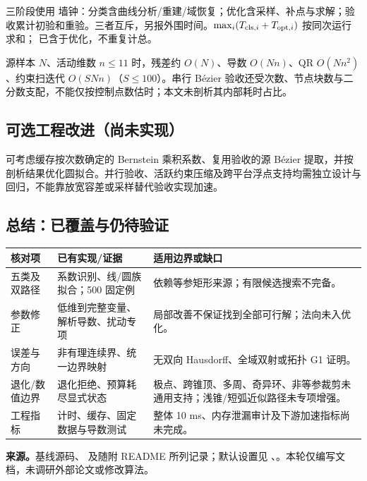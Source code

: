 三阶段使用  墙钟：分类含曲线分析/重建/域恢复；优化含采样、补点与求解；验收累计初验和重验。三者互斥，另报外围时间。$\max_i(T_{{\rm cls},i}+T_{{\rm opt},i})$ 按同次运行求和； 已含于优化，不重复计总。

源样本 $N$、活动维数 $n\le11$ 时，残差约 $O(N)$、导数 $O(Nn)$、QR $O(Nn^2)$、约束扫迭代 $O(SNn)$（$S\le100$）。串行 Bézier 验收还受次数、节点块数与二分数支配，不能仅按控制点数估时；本文未剖析其内部耗时占比。

\subsection{可选工程改进（尚未实现）}
可考虑缓存按次数确定的 Bernstein 乘积系数、复用验收的源 Bézier 提取，并按剖析结果优化圆拟合。并行验收、活跃约束压缩及跨平台浮点支持均需独立设计与回归，不能靠放宽容差或采样替代验收实现加速。

\subsection{总结：已覆盖与仍待验证}
\par{\small\begin{tabularx}{\linewidth}{@{}l Y Y@{}}\toprule
核对项 & 已有实现/证据 & 适用边界或缺口\\\midrule
五类及双路径 & 系数识别、线/圆族拟合；500 固定例 & 依赖等参矩形来源；有限候选搜索不完备。\\
参数修正 & 低维到完整变量、解析导数、扰动专项 & 局部改善不保证找到全部可行解；法向未入优化。\\
误差与方向 & 非有理连续界、统一边界映射 & 无双向 Hausdorff、全域双射或拓扑 G1 证明。\\
退化/数值边界 & 退化拒绝、预算耗尽显式状态 & 极点、跨锥顶、多周、奇异环、非等参裁剪未通用支持；浅锥/短弧近似路径未专项增强。\\
工程指标 & 计时、缓存、固定数据与导数测试 & 整体 10 ms、内存泄漏审计及下游加速指标尚未完成。\\\bottomrule
\end{tabularx}}

\textbf{来源。}基线源码、 及随附 README 所列记录；默认设置见 、。本轮仅编写文档，未调研外部论文或修改算法。
